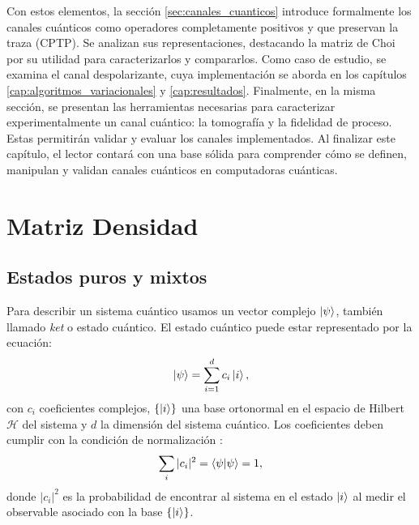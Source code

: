 \documentclass[letterpaper,12pt]{thesisECFM}
\theoremstyle{plain}
\theoremstyle{definition}
\theoremstyle{definition}
\theoremstyle{remark}
\newcommand{\1}{\mathbb{1}}
\begin{document}
Con estos elementos, la sección \ref{sec:canales_cuanticos} introduce
formalmente los canales cuánticos como operadores completamente positivos y que
preservan la traza (CPTP). Se analizan sus representaciones, destacando la
matriz de Choi por su utilidad para caracterizarlos y compararlos. Como caso de
estudio, se examina el canal despolarizante, cuya implementación se aborda en
los capítulos \ref{cap:algoritmos_variacionales} y \ref{cap:resultados}.
Finalmente, en la misma sección, se presentan las herramientas necesarias para
caracterizar experimentalmente un canal cuántico: la tomografía y la fidelidad
de proceso. Estas permitirán validar y evaluar los canales implementados. Al
finalizar este capítulo, el lector contará con una base sólida para comprender
cómo se definen, manipulan y validan canales cuánticos en computadoras
cuánticas. 
\section{Matriz Densidad} %
\label{sec:matriz_densidad}
\subsection{Estados puros y mixtos} %
Para describir un sistema cuántico usamos un vector complejo $\ket{\psi}$,
también llamado \textit{ket} o estado cuántico. El
estado cuántico puede estar representado por la ecuación: 
\begin{equation}
     \label{eq:1.1}
         \ket{\psi} = \sum_{i=1}^{d} c_i \ket{i},
\end{equation}
con $c_i$ coeficientes complejos,
$\{\ket{i}\}$ una base ortonormal en el espacio de Hilbert $\mathcal{H}$ del
sistema  y $d$ la dimensión del
sistema cuántico.  Los coeficientes deben cumplir con la condición de
normalización \cite{nielsen_chuang_2011}:
    \begin{equation}
    \label{ec::1.2}
           \sum_i |c_i|^2=\braket{\psi}{\psi}=1, 
    \end{equation} 
donde $|c_i|^2$ es la probabilidad de encontrar al sistema en el estado
$\ket{i}$ al medir el observable asociado con la base $\{\ket{i} \}$.
\end{document}
